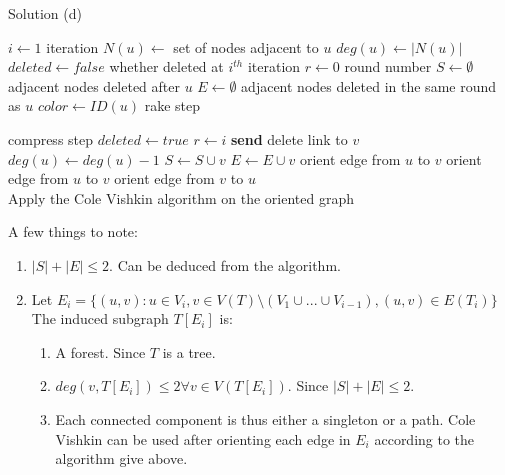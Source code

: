 \begin{solution*}{Solution (d)}{}
	\begin{algorithmic}
	\State $ i \gets 1$
	\Comment iteration
	\State $ N(u) \gets$ set of nodes adjacent to $u$
	\State $ deg(u) \gets |N(u)|$
	\State $ deleted \gets false$
	\Comment whether deleted at $i^{th}$ iteration
	\State $ r \gets 0$
	\Comment round number
	\State $ S \gets \emptyset$
	\Comment adjacent nodes deleted after $u$
	\State $ E \gets \emptyset$
	\Comment adjacent nodes deleted in the same round as $u$
	\State $ color \gets ID(u) $
	\newline
		\Comment rake step
			\State {}
		\EndIf

		\Comment compress step
			\State {}
		\EndIf
		\State {}
	\EndWhile
	\newline
			\State {}
		\EndIf
	\EndFor
	\newline
		\State $deleted \gets true$
		\State $r \gets i$
		\State \textbf{send} delete link to $v$
		\EndFor
	\EndFunction
	\newline
			\State $deg(u) \gets deg(u) -1$
				\State $S \gets S \cup v$
			\Else
				\State $E \gets E \cup v$
			\EndIf
		\EndIf
	\EndFor
	\EndFunction
	\newline
		\State orient edge from $u$ to $v$
	\EndFor
			\State orient edge from $u$ to $v$
		\Else
			\State orient edge from $v$ to $u$
		\EndIf
	\EndFor \\
	Apply the Cole Vishkin algorithm on the oriented graph
	\EndFunction
	\newline
	\end{algorithmic}
A few things to note:
\begin{enumerate}
	\item $|S| + |E| \leq 2$. Can be deduced from the algorithm.
	\item Let $E_i = \{(u,v): u \in V_i, v \in V (T)\setminus (V_1\cup ...\cup V_{i-1}), (u,v) \in E(T_i)\}$ The induced subgraph $T[E_i]$ is: 
		\begin{enumerate}
			\item A forest. Since $T$ is a tree.
			\item $deg(v, T[E_i]) \leq 2 \forall v \in V(T[E_i])$. Since $|S| + |E| \leq 2$.
			\item Each connected component is thus either a singleton or a path. Cole Vishkin can be used after orienting each edge in $E_i$ according to the algorithm give above.
		\end{enumerate}
\end{enumerate}
\end{solution*}






